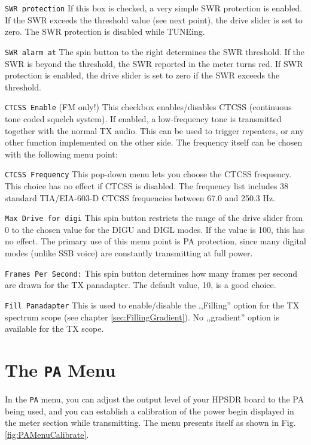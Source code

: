 \documentclass[12pt]{book}
\def\rett#1{\texttt{\color{red}#1}}
\def\bltt#1{\texttt{\color{blue}#1}}
\begin{document}
\rett{SWR protection} If this box is checked, a very simple SWR protection is enabled. If the SWR exceeds
the threshold value (see next point), the drive slider is set to zero. The SWR protection is disabled
while TUNEing.

\rett{SWR alarm at} The spin button to the right determines the SWR threshold. If the SWR is beyond the
threshold, the SWR reported in the meter turns red. If SWR protection is enabled, the drive slider is set to
zero if the SWR exceeds the threshold.

\rett{CTCSS Enable} (FM only!) This checkbox enables/disables CTCSS (continuous tone coded squelch system).
If enabled, a low-frequency
tone is transmitted together with the normal TX audio. This can be used to trigger repeaters, or any other
function implemented
on the other side. The frequency itself can be chosen with the following menu point:

\rett{CTCSS Frequency} This pop-down menu lets you choose the CTCSS frequency. This choice has no effect if
CTCSS is disabled.
The frequency list includes 38 standard TIA/EIA-603-D CTCSS frequencies between 67.0 and 250.3 Hz.

\rett{Max Drive for digi} This spin button restricts the range of the drive slider from 0 to the
chosen value
for the DIGU and DIGL modes. If the value is 100, this has no effect. The primary use of this menu point is
PA protection,
since many digital modes (unlike SSB voice) are constantly transmitting at full power.

\rett{Frames Per Second:} This spin button determines how many frames per second are drawn for the TX
panadapter. The default value, 10, is a good choice.

\rett{Fill Panadapter} This is used to enable/disable the ,,Filling'' option
for the TX  spectrum scope (see chapter \ref{sec:FillingGradient}). No ,,gradient''
option is available for the TX scope.

\section{The \texttt{PA} Menu}

In the \bltt{PA} menu, you can adjust the output level of your HPSDR board
to the PA being used, and you can establish a calibration of the
power begin displayed in the meter section while transmitting.
The menu presents itself as shown in Fig. \ref{fig:PAMenuCalibrate}.
\end{document}
